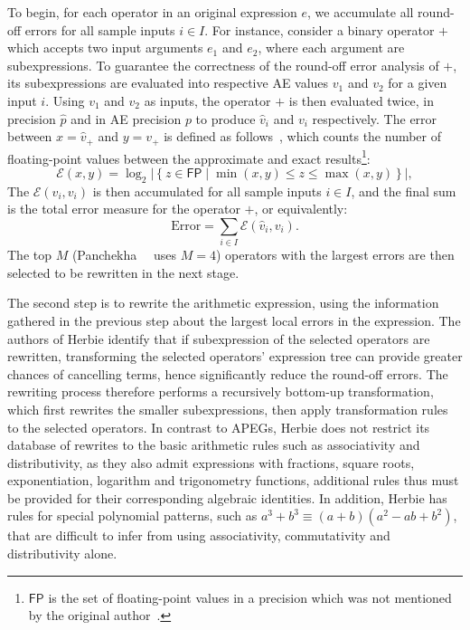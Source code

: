 To begin, for each operator in an original expression $e$, we accumulate all
round-off errors for all sample inputs $i \in I$.  For instance, consider
a binary operator $+$ which accepts two input arguments $e_1$ and $e_2$,
where each argument are subexpressions.  To guarantee the correctness of
the round-off error analysis of $+$, its subexpressions are evaluated
into respective AE values $v_1$ and $v_2$ for a given input $i$.  Using
$v_1$ and $v_2$ as inputs, the operator $+$ is then evaluated twice, in
precision $\hat{p}$ and in AE precision $p$ to produce $\hat{v}_i$ and $v_i$
respectively.  The error between $x = \hat{v}_+$ and $y = v_+$ is defined
as follows~\cite{panchekha15, schkufza14}, which counts the number of
floating-point values between the approximate and exact results\footnote{%
    $\mathsf{FP}$ is the set of floating-point values in a precision which was
    not mentioned by the original author~\cite{panchekha15}.
}:
\begin{equation}
    \mathcal{E}(x, y) = \log_2 \left| \left\{
        z \in \mathsf{FP} \mid \min(x, y) \leq z \leq \max(x, y)
    \right\} \right|,
\end{equation}
The $\mathcal{E}(\hat{v}_i, v_i)$ is then accumulated for all sample inputs $i
\in I$, and the final sum is the total error measure for the operator $+$, or
equivalently:
\begin{equation}
    \mathrm{Error} = \sum_{i \in I} \mathcal{E}(\hat{v}_i, v_i).
\end{equation}
The top $M$ (Panchekha~\etal~\cite{panchekha15} uses $M = 4$) operators with
the largest errors are then selected to be rewritten in the next stage.

The second step is to rewrite the arithmetic expression, using the information
gathered in the previous step about the largest local errors in the expression.
The authors of Herbie identify that if subexpression of the selected operators
are rewritten, transforming the selected operators' expression tree can provide
greater chances of cancelling terms, hence significantly reduce the round-off
errors.  The rewriting process therefore performs a recursively bottom-up
transformation, which first rewrites the smaller subexpressions, then apply
transformation rules to the selected operators.  In contrast to APEGs, Herbie
does not restrict its database of rewrites to the basic arithmetic rules such
as associativity and distributivity, as they also admit expressions with
fractions, square roots, exponentiation, logarithm and trigonometry functions,
additional rules thus must be provided for their corresponding algebraic
identities.  In addition, Herbie has rules for special polynomial patterns,
such as $a^3 + b^3 \equiv (a + b)(a^2 - ab + b^2)$, that are difficult to infer
from using associativity, commutativity and distributivity alone.

